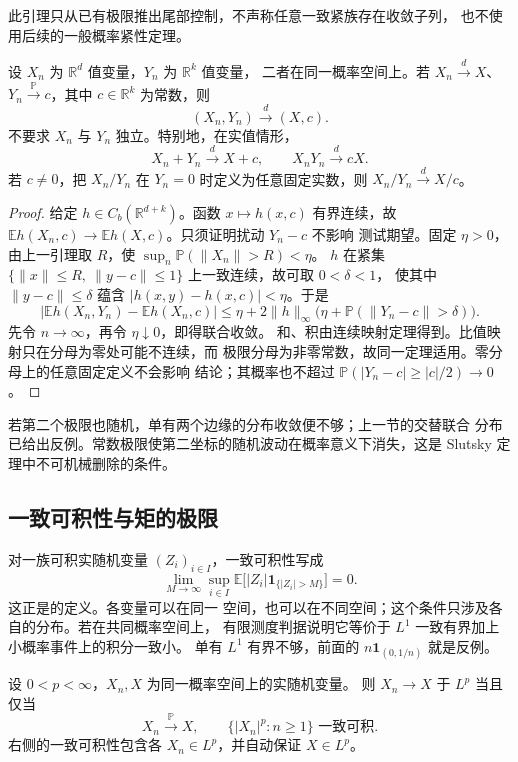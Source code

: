 此引理只从已有极限推出尾部控制，不声称任意一致紧族存在收敛子列，
也不使用后续的一般概率紧性定理。

\begin{theorem}[Slutsky]
\label{thm:slutsky}
设 $X_n$ 为 $\mathbb R^d$ 值变量，$Y_n$ 为 $\mathbb R^k$ 值变量，
二者在同一概率空间上。若 $X_n\xrightarrow dX$、
$Y_n\xrightarrow{\mathbb P}c$，其中 $c\in\mathbb R^k$ 为常数，则
\[
 (X_n,Y_n)\xrightarrow d(X,c).
\]
不要求 $X_n$ 与 $Y_n$ 独立。特别地，在实值情形，
\[
 X_n+Y_n\xrightarrow d X+c,\qquad
 X_nY_n\xrightarrow d cX.
\]
若 $c\ne0$，把 $X_n/Y_n$ 在 $Y_n=0$ 时定义为任意固定实数，则
$X_n/Y_n\xrightarrow d X/c$。
\end{theorem}

\begin{proof}
给定 $h\in C_b(\mathbb R^{d+k})$。函数 $x\mapsto h(x,c)$ 有界连续，故
$\mathbb E h(X_n,c)\to\mathbb E h(X,c)$。只须证明扰动 $Y_n-c$ 不影响
测试期望。固定 $\eta>0$，由上一引理取 $R$，使
$\sup_n\mathbb P(\|X_n\|>R)<\eta$。
$h$ 在紧集
$\{\|x\|\le R,\ \|y-c\|\le1\}$ 上一致连续，故可取 $0<\delta<1$，
使其中 $\|y-c\|\le\delta$ 蕴含
$|h(x,y)-h(x,c)|<\eta$。于是
\[
 |\mathbb E h(X_n,Y_n)-\mathbb E h(X_n,c)|
 \le\eta+2\|h\|_\infty
    \bigl(\eta+\mathbb P(\|Y_n-c\|>\delta)\bigr).
\]
先令 $n\to\infty$，再令 $\eta\downarrow0$，即得联合收敛。
和、积由连续映射定理得到。比值映射只在分母为零处可能不连续，而
极限分母为非零常数，故同一定理适用。零分母上的任意固定定义不会影响
结论；其概率也不超过
$\mathbb P(|Y_n-c|\ge|c|/2)\to0$。
\end{proof}

若第二个极限也随机，单有两个边缘的分布收敛便不够；上一节的交替联合
分布已给出反例。常数极限使第二坐标的随机波动在概率意义下消失，这是
Slutsky 定理中不可机械删除的条件。

\subsection{一致可积性与矩的极限}

对一族可积实随机变量 $(Z_i)_{i\in I}$，一致可积性写成
\[
 \lim_{M\to\infty}\sup_{i\in I}
 \mathbb E\bigl[|Z_i|\mathbf1_{\{|Z_i|>M\}}\bigr]=0.
\]
这正是的定义。各变量可以在同一
空间，也可以在不同空间；这个条件只涉及各自的分布。若在共同概率空间上，
有限测度判据说明它等价于 $L^1$ 一致有界加上小概率事件上的积分一致小。
单有 $L^1$ 有界不够，前面的 $n\mathbf1_{(0,1/n)}$ 就是反例。

\begin{theorem}
\label{thm:probability-vitali-lp}
设 $0<p<\infty$，$X_n,X$ 为同一概率空间上的实随机变量。
则 $X_n\to X$ 于 $L^p$ 当且仅当
\[
 X_n\xrightarrow{\mathbb P}X,
 \qquad\{|X_n|^p:n\ge1\}\text{ 一致可积}.
\]
右侧的一致可积性包含各 $X_n\in L^p$，并自动保证 $X\in L^p$。
\end{theorem}

